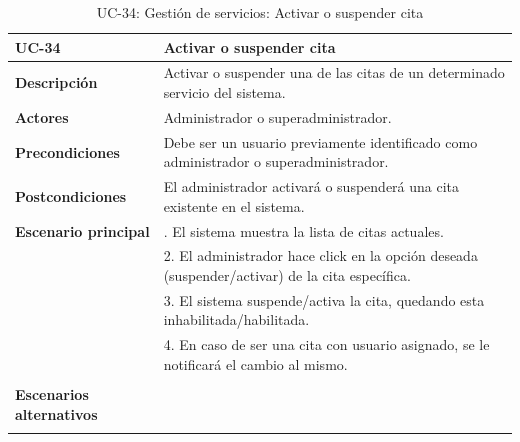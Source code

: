 \begin{table}
  \begin{center}
    \begin{tabularx}{16.4cm}{|l|X|}
      \hline
      \textbf{UC-34} & \textbf{Activar o suspender cita}\\
      \hline
      \textbf{Descripción} & Activar o suspender una de las citas de un determinado servicio del sistema.\\
      \hline
      \textbf{Actores} & Administrador o superadministrador.\\
      \hline
      \textbf{Precondiciones} & Debe ser un usuario previamente identificado como administrador o superadministrador.\\
      \hline
      \textbf{Postcondiciones} & El administrador activará o suspenderá una cita existente en el sistema.\\
      \hline
      \textbf{Escenario principal} & \smallskip 1. El sistema muestra la lista de citas actuales.\\
      & 2. El administrador hace click en la opción deseada (suspender/activar) de la cita específica.\\
      & 3. El sistema suspende/activa la cita, quedando esta inhabilitada/habilitada.\\
      & 4. En caso de ser una cita con usuario asignado, se le notificará el cambio al mismo.\\
      & \\
      \hline
      \textbf{Escenarios alternativos} & \smallskip \\
      & \\
      \hline
    \end{tabularx}
    \caption{UC-34: Gestión de servicios: Activar o suspender cita}
    \label{tab:CU-activar-suspender-cita}
  \end{center}
\end{table}


